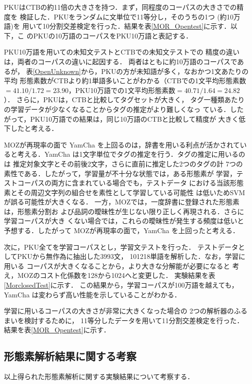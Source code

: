 PKUはCTBの約11倍の大きさを持つ．まず，同程度のコーパスの大きさでの精度を
検証した．PKUをランダムに文単位で11等分し，そのうちの1つ (約10万語)を
用いて10分割交差検定を行った．結果を表\ref{MOR_Opentest}に示す．以下，こ
のPKUの10万語のコーパスをPKU10万語と表記する．

PKU10万語を用いての未知文テストとCTBでの未知文テストでの
精度の違いは，両者のコーパスの違いに起因する．
両者はともに約10万語のコーパスであるが，
表\ref{OpenUnknown}から，PKUの方が未知語が多く，なおかつ1文あたりの平均
形態素数がCTBより約1単語多いことがわかる（CTBでの1文平均形態素数
$=41.10/1.72=23.90$，PKU10万語での1文平均形態素数$=40.71/1.64=24.82$）．
さらに，PKUは，CTBと比較してタグセットが大きく，
タグ一種類あたりの学習データが少なくなることからタグの推定がより難しくなっ
ている．したがって，PKU10万語での結果は，同じ10万語のCTBと比較して精度が
大きく低下したと考える．

MOZが再現率の面で YamCha を上回るのは，辞書を用いる利点が活かされてい
ると考える．YamCha は1文字単位でタグの推定を行う．タグの推定に用いるのは
推定対象文字とその前後2文字，さらに直前に推定した2つのタグの計
7つの素性である．したがって，学習量が不十分な状態では，ある形態素が
学習，テストコーパスの両方に含まれている場合でも，テストデータ
における当該形態素とその周辺文字列の組合せを素性として学習している可能性
は低いためSVMが誤る可能性が大きくなる．
一方，MOZでは，一度辞書に登録された形態素は，形態素分割お
よび品詞の曖昧性が生じない限り正しく再現される．さらに学習コーパスが大き
くない場合では，これらの曖昧性が発生する頻度は低いと予想する．したがって
MOZが再現率の面で，YamCha を上回ったと考える．

次に，PKU全てを学習コーパスとし，学習文テストを行った．
テストデータとしてPKUから無作為に抽出した3993文，
101218単語を解析した．なお，学習に用いる
コーパスが大きくなることから，より大きな分解能が必要になると
考え，MOZのコスト化係数を128から1024へと変更した．
実験結果を表\ref{MorclosedTest}に示す．
この結果から，学習コーパスが100万語を越えても，
YamCha は変わらず高い性能を示していることがわかる．

学習に用いるコーパスの大きさが非常に大きくなった場合の
2つの解析器のふるまいを検討するために，
11等分したデータを用いて11分割交差検定を行った．
結果を表\ref{MOR_Opentest}に示す．

\subsection{形態素解析結果に関する考察}
以上得られた形態素解析に関する実験結果について考察する．

